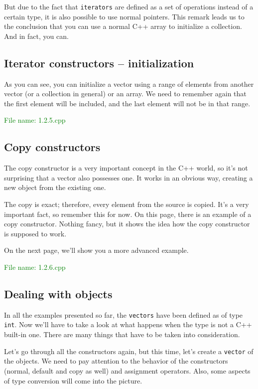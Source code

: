 But due to the fact that \texttt{iterators} are defined as a set of operations instead 
of a certain type, it is also possible to use normal pointers. This remark leads us to 
the conclusion that you can use a normal C++ array to initialize a collection. 
And in fact, you can.

\subsection{Iterator constructors – initialization} %
As you can see, you can initialize a vector using a range of elements from another vector 
(or a collection in general) or an array. We need to remember again that the first element 
will be included, and the last element will not be in that range.

\textcolor{green}{File name: 1.2.5.cpp}


\subsection{Copy constructors} %
The copy constructor is a very important concept in the C++ world, so it’s not surprising 
that a vector also possesses one. It works in an obvious way, creating a new object from the existing one.

The copy is exact; therefore, every element from the source is copied. It’s a very important fact, so 
remember this for now. On this page, there is an example of a copy constructor. Nothing fancy, but 
it shows the idea how the copy constructor is supposed to work.

On the next page, we’ll show you a more advanced example.

\textcolor{green}{File name: 1.2.6.cpp}


\subsection{Dealing with objects} %
In all the examples presented so far, the \texttt{vectors} have been defined as of type \texttt{int}.  
Now we’ll have to take a look at what happens when the type is not a C++ built-in one. There are many 
things that have to be taken into consideration.

Let’s go through all the constructors again, but this time, let’s create a \texttt{vector} of the objects. 
We need to pay attention to the behavior of the constructors (normal, default and copy as well) and 
assignment operators. Also, some aspects of type conversion will come into the picture.

